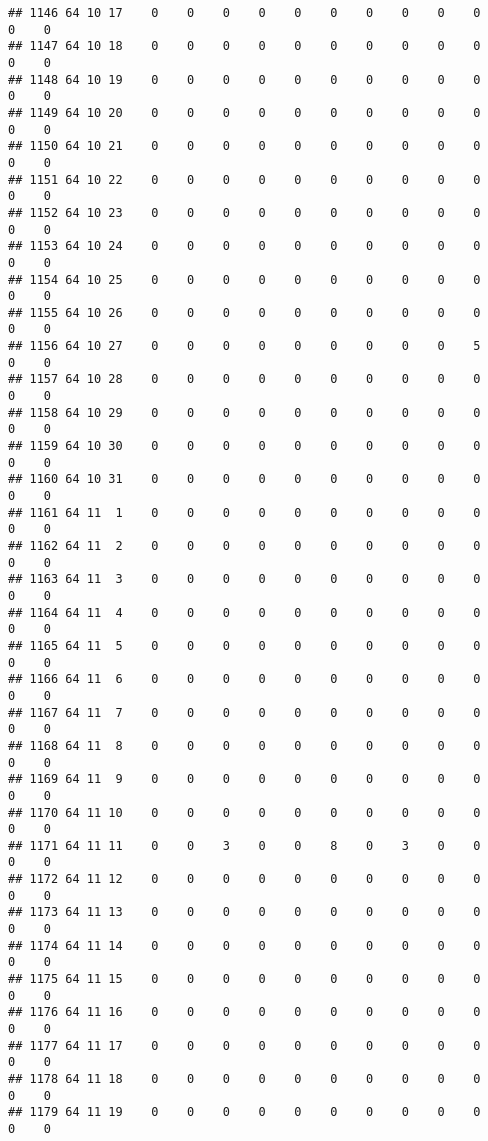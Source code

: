 \documentclass[]{article}
\begin{document}
\begin{verbatim}
## 1146 64 10 17    0    0    0    0    0    0    0    0    0    0    0    0
## 1147 64 10 18    0    0    0    0    0    0    0    0    0    0    0    0
## 1148 64 10 19    0    0    0    0    0    0    0    0    0    0    0    0
## 1149 64 10 20    0    0    0    0    0    0    0    0    0    0    0    0
## 1150 64 10 21    0    0    0    0    0    0    0    0    0    0    0    0
## 1151 64 10 22    0    0    0    0    0    0    0    0    0    0    0    0
## 1152 64 10 23    0    0    0    0    0    0    0    0    0    0    0    0
## 1153 64 10 24    0    0    0    0    0    0    0    0    0    0    0    0
## 1154 64 10 25    0    0    0    0    0    0    0    0    0    0    0    0
## 1155 64 10 26    0    0    0    0    0    0    0    0    0    0    0    0
## 1156 64 10 27    0    0    0    0    0    0    0    0    0    5    0    0
## 1157 64 10 28    0    0    0    0    0    0    0    0    0    0    0    0
## 1158 64 10 29    0    0    0    0    0    0    0    0    0    0    0    0
## 1159 64 10 30    0    0    0    0    0    0    0    0    0    0    0    0
## 1160 64 10 31    0    0    0    0    0    0    0    0    0    0    0    0
## 1161 64 11  1    0    0    0    0    0    0    0    0    0    0    0    0
## 1162 64 11  2    0    0    0    0    0    0    0    0    0    0    0    0
## 1163 64 11  3    0    0    0    0    0    0    0    0    0    0    0    0
## 1164 64 11  4    0    0    0    0    0    0    0    0    0    0    0    0
## 1165 64 11  5    0    0    0    0    0    0    0    0    0    0    0    0
## 1166 64 11  6    0    0    0    0    0    0    0    0    0    0    0    0
## 1167 64 11  7    0    0    0    0    0    0    0    0    0    0    0    0
## 1168 64 11  8    0    0    0    0    0    0    0    0    0    0    0    0
## 1169 64 11  9    0    0    0    0    0    0    0    0    0    0    0    0
## 1170 64 11 10    0    0    0    0    0    0    0    0    0    0    0    0
## 1171 64 11 11    0    0    3    0    0    8    0    3    0    0    0    0
## 1172 64 11 12    0    0    0    0    0    0    0    0    0    0    0    0
## 1173 64 11 13    0    0    0    0    0    0    0    0    0    0    0    0
## 1174 64 11 14    0    0    0    0    0    0    0    0    0    0    0    0
## 1175 64 11 15    0    0    0    0    0    0    0    0    0    0    0    0
## 1176 64 11 16    0    0    0    0    0    0    0    0    0    0    0    0
## 1177 64 11 17    0    0    0    0    0    0    0    0    0    0    0    0
## 1178 64 11 18    0    0    0    0    0    0    0    0    0    0    0    0
## 1179 64 11 19    0    0    0    0    0    0    0    0    0    0    0    0

\end{verbatim}
\end{document}
